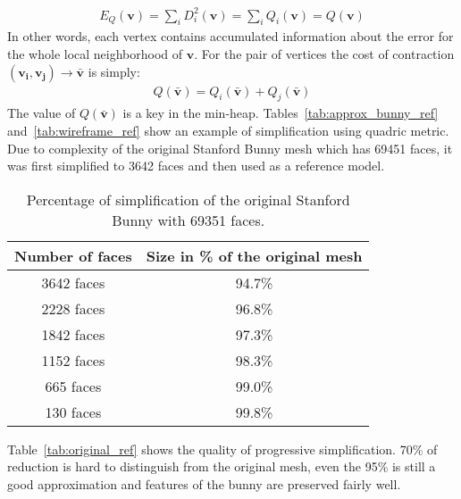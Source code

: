 \begin{align}
E_Q(\mathbf{v}) = \sum_{i} D_i^2(\mathbf{v}) = \sum_{i} Q_i(\mathbf{v}) = Q(\mathbf{v})
\end{align}
In other words, each vertex contains accumulated information about the error for the whole local neighborhood of $\mathbf{v}$. For the pair of vertices the cost of contraction $(\mathbf{v_i}, \mathbf{v_j})\rightarrow\bar{\mathbf{v}}$ is simply:
\begin{align}
Q(\mathbf{\bar{v}}) = Q_i(\mathbf{\bar{v}}) + Q_j(\mathbf{\bar{v}})
\end{align}
The value of $Q(\mathbf{\bar{v}})$ is a key in the min-heap. Tables~\ref{tab:approx_bunny_ref} and~\ref{tab:wireframe_ref} show an example of simplification using quadric metric. Due to complexity of the original Stanford Bunny mesh which has 69451 faces, it was first simplified to 3642 faces and then used as a reference model.

\begin{table}[h!]
\centering
\begin{tabular}{ |c|c| } 
 \hline
 Number of faces & Size in \% of the original mesh\\
 \hline
 3642 faces & 94.7\% \\ 
 2228 faces & 96.8\% \\ 
 1842 faces & 97.3\%\\ 
 1152 faces & 98.3\%\\ 
 665 faces & 99.0\%\\ 
 130 faces & 99.8\%\\
 \hline
\end{tabular}
\caption{Percentage of simplification of the original Stanford Bunny with 69351 faces.}
\end{table}
Table~\ref{tab:original_ref} shows the quality of progressive simplification. 70\% of reduction is hard to distinguish from the original mesh, even the 95\% is still a good approximation and features of the bunny are preserved fairly well.

